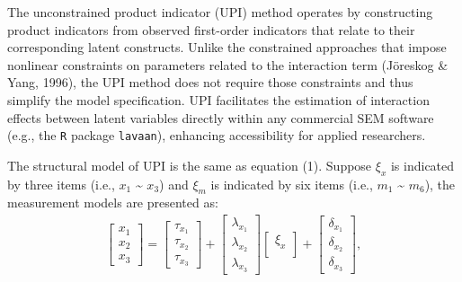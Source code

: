 \documentclass[
  man]{apa6}
\begin{document}
The unconstrained product indicator (UPI) method operates by constructing product indicators from observed first-order indicators that relate to their corresponding latent constructs. Unlike the constrained approaches that impose nonlinear constraints on parameters related to the interaction term (Jöreskog \& Yang, 1996), the UPI method does not require those constraints and thus simplify the model specification. UPI facilitates the estimation of interaction effects between latent variables directly within any commercial SEM software (e.g., the \texttt{R} package \texttt{lavaan}), enhancing accessibility for applied researchers.

The structural model of UPI is the same as equation (1). Suppose \(\xi_{x}\) is indicated by three items (i.e., \(x_{1}\) \textasciitilde{} \(x_{3}\)) and \(\xi_{m}\) is indicated by six items (i.e., \(m_{1}\) \textasciitilde{} \(m_{6}\)), the measurement models are presented as:
\begin{align}
    \begin{bmatrix}
        x_{1} \\
        x_{2} \\ 
        x_{3}
    \end{bmatrix} =
    \begin{bmatrix}
        \tau_{x_{1}} \\
        \tau_{x_{2}} \\ 
        \tau_{x_{3}}
    \end{bmatrix} +
    \begin{bmatrix}
        \lambda_{x_{1}} \\
        \lambda_{x_{2}} \\ 
        \lambda_{x_{3}}
    \end{bmatrix}
    \begin{bmatrix}
        \xi_{x} \\
    \end{bmatrix} +
    \begin{bmatrix}
        \delta_{x_{1}} \\
        \delta_{x_{2}} \\ 
        \delta_{x_{3}}
    \end{bmatrix},
\end{align}
\end{document}
